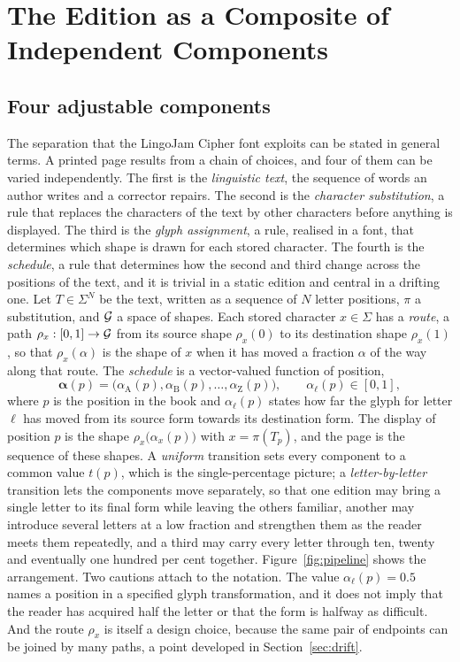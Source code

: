 \section{The Edition as a Composite of Independent Components}\label{sec:edition}

\subsection{Four adjustable components}

The separation that the LingoJam Cipher font exploits can be stated in general terms. A printed page results from a chain of choices, and four of them can be varied independently. The first is the \emph{linguistic text}, the sequence of words an author writes and a corrector repairs. The second is the \emph{character substitution}, a rule that replaces the characters of the text by other characters before anything is displayed. The third is the \emph{glyph assignment}, a rule, realised in a font, that determines which shape is drawn for each stored character. The fourth is the \emph{schedule}, a rule that determines how the second and third change across the positions of the text, and it is trivial in a static edition and central in a drifting one. Let $T\in\Sigma^{N}$ be the text, written as a sequence of $N$ letter positions, $\pi$ a substitution, and $\mathcal{G}$ a space of shapes. Each stored character $x\in\Sigma$ has a \emph{route}, a path $\rho_x:[0,1]\to\mathcal{G}$ from its source shape $\rho_x(0)$ to its destination shape $\rho_x(1)$, so that $\rho_x(\alpha)$ is the shape of $x$ when it has moved a fraction $\alpha$ of the way along that route. The \emph{schedule} is a vector-valued function of position,
\[
\boldsymbol{\alpha}(p)=\bigl(\alpha_{\mathrm A}(p),\alpha_{\mathrm B}(p),\ldots,\alpha_{\mathrm Z}(p)\bigr),\qquad \alpha_\ell(p)\in[0,1],
\]
where $p$ is the position in the book and $\alpha_\ell(p)$ states how far the glyph for letter $\ell$ has moved from its source form towards its destination form. The display of position $p$ is the shape $\rho_{x}\bigl(\alpha_{x}(p)\bigr)$ with $x=\pi(T_p)$, and the page is the sequence of these shapes. A \emph{uniform} transition sets every component to a common value $t(p)$, which is the single-percentage picture; a \emph{letter-by-letter} transition lets the components move separately, so that one edition may bring a single letter to its final form while leaving the others familiar, another may introduce several letters at a low fraction and strengthen them as the reader meets them repeatedly, and a third may carry every letter through ten, twenty and eventually one hundred per cent together. Figure~\ref{fig:pipeline} shows the arrangement. Two cautions attach to the notation. The value $\alpha_\ell(p)=0.5$ names a position in a specified glyph transformation, and it does not imply that the reader has acquired half the letter or that the form is halfway as difficult. And the route $\rho_x$ is itself a design choice, because the same pair of endpoints can be joined by many paths, a point developed in Section~\ref{sec:drift}.

